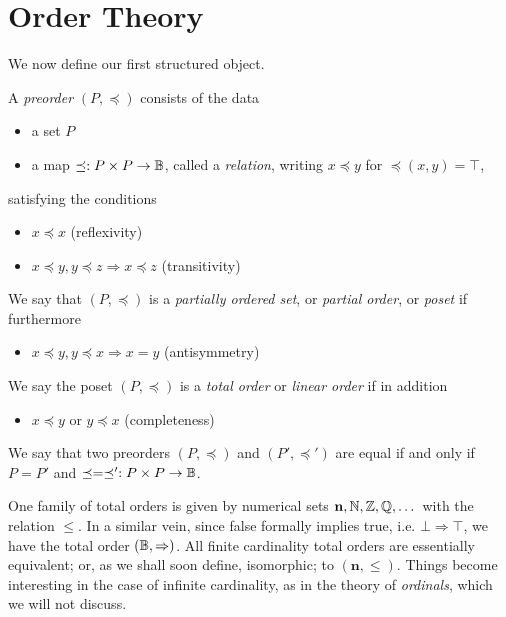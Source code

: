 \section{Order Theory}

We now define our first structured object.

\begin{dfn}
A \emph{preorder} $(P,\preceq)$ consists of the data
\begin{itemize}
    \item a set $P$
    \item a map $\preceq : P\times P\to\mathbb B$, called a \emph{relation}, writing $x\preceq y$ for $\preceq(x,y)=\top$,
\end{itemize}
satisfying the conditions
\begin{itemize}
    \item $x\preceq x$ (reflexivity)
    \item $x\preceq y,y\preceq z\Rightarrow x\preceq z$ (transitivity)
\end{itemize}
We say that $(P,\preceq)$ is a \emph{partially ordered set}, or \emph{partial order}, or \emph{poset} if furthermore
\begin{itemize}
    \item $x\preceq y,y\preceq x\Rightarrow x=y$ (antisymmetry)
\end{itemize}
We say the poset $(P,\preceq)$ is a \emph{total order} or \emph{linear order} if in addition
\begin{itemize}
    \item $x\preceq y$ or $y\preceq x$ (completeness)
\end{itemize}
\end{dfn}

We say that two preorders $(P,\preceq)$ and $(P',\preceq')$ are equal if and only if $P=P'$ and $\preceq=\preceq':P\times P\to\mathbb B$.

One family of total orders is given by numerical sets $\mathbf{n},\mathbb N,\mathbb Z,\mathbb Q,\dots$ with the relation $\leq$. In a similar vein, since false formally implies true, i.e. $\bot\Rightarrow\top$, we have the total order $(\mathbb B,\Rightarrow)$. All finite cardinality total orders are essentially equivalent; or, as we shall soon define, isomorphic; to $(\mathbf{n},\leq)$. Things become interesting in the case of infinite cardinality, as in the theory of \emph{ordinals}, which we will not discuss.

